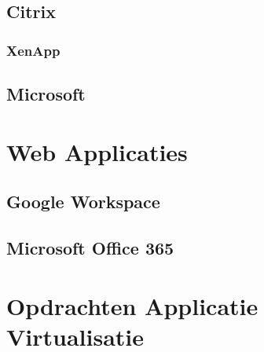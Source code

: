 \documentclass[a4paper,12pt,twoside,openright,titlepage]{book}
\begin{document}
\subsection{Citrix}


\subsubsection{XenApp}

\subsection{Microsoft}

\section{Web Applicaties}

\subsection{Google Workspace}

\subsection{Microsoft Office 365}

\section{Opdrachten Applicatie Virtualisatie}


\printindex
\end{document}
